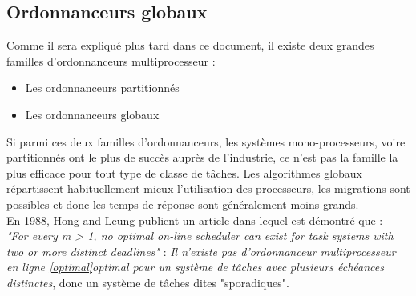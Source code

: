 \documentclass[11pt,a4paper,oneside]{report}
\begin{document}


\subsection{Ordonnanceurs globaux}
Comme il sera expliqué plus tard dans ce document, il existe deux grandes familles d'ordonnanceurs 
multiprocesseur :\\
\begin{itemize}
	\item Les ordonnanceurs partitionnés
	\item Les ordonnanceurs globaux
\end{itemize}
Si parmi ces deux familles d'ordonnanceurs, les systèmes mono-processeurs, voire 
partitionnés ont le plus de succès auprès de l'industrie, 
ce n'est pas la famille la plus efficace pour tout type de classe de tâches. 
Les algorithmes globaux répartissent habituellement mieux l'utilisation des processeurs, 
les migrations sont possibles et donc les temps de réponse sont généralement moins grands.
\\ 


En 1988, Hong and Leung \cite{hong_-line_1988} publient un article dans lequel est 
démontré que : \\
\textit{"For every m > 1, no optimal on-line scheduler can exist for task systems with two or more distinct deadlines"} : 
\textit{Il n'existe pas d'ordonnanceur multiprocesseur en ligne \ref{optimal}{optimal} pour un système de tâches 
avec plusieurs échéances distinctes}, donc un système de tâches dites "sporadiques".
\end{document}
